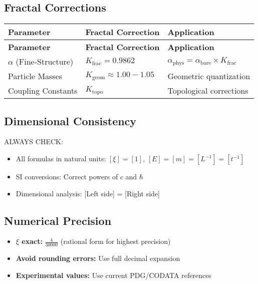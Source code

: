 \documentclass[12pt,a4paper]{article}
\begin{document}
	\subsection{Fractal Corrections}
	
	\begin{longtable}{|p{4cm}|p{4cm}|p{5cm}|}
		\hline
		\textbf{Parameter} & \textbf{Fractal Correction} & \textbf{Application} \\
		\hline
		\endfirsthead
		\hline
		\textbf{Parameter} & \textbf{Fractal Correction} & \textbf{Application} \\
		\hline
		\endhead
		\(\alpha\) (Fine-Structure) & \(K_{\text{frac}} = 0.9862\) & \(\alpha_{\text{phys}} = \alpha_{\text{bare}} \times K_{\text{frac}}\) \\
		\hline
		Particle Masses & \(K_{\text{geom}} \approx 1.00-1.05\) & Geometric quantization \\
		\hline
		Coupling Constants & \(K_{\text{topo}}\) & Topological corrections \\
		\hline
	\end{longtable}
	
	\subsection{Dimensional Consistency}
	
	ALWAYS CHECK:
	\begin{itemize}
		\item All formulas in natural units: \([\xi] = [1]\), \([E] = [m] = [L^{-1}] = [t^{-1}]\)
		\item SI conversions: Correct powers of \(c\) and \(\hbar\)
		\item Dimensional analysis: [Left side] = [Right side]
	\end{itemize}
	
	\subsection{Numerical Precision}
	
	\begin{itemize}
		\item \textbf{\(\xi\) exact:} \(\frac{4}{30000}\) (rational form for highest precision)
		\item \textbf{Avoid rounding errors:} Use full decimal expansion
		\item \textbf{Experimental values:} Use current PDG/CODATA references
	\end{itemize}
	
\end{document}
